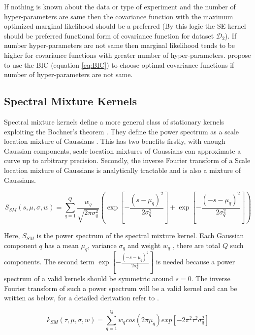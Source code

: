 If nothing is known about the data or type of experiment and the number of hyper-parameters are same then the covariance function with the maximum optimized marginal likelihood should be a preferred (By this logic the SE kernel should be preferred functional form of covariance function for dataset $\mathcal{D}_{2}$). If number hyper-parameters are not same then marginal likelihood tends to be higher for covariance functions with greater number of hyper-parameters. \cite{duvenaud-thesis-2014, lloyd2014automatic} propose to use the BIC (equation \ref{eq:BIC}) to choose optimal covariance functions if number of hyper-parameters are not same. 

\subsection{Spectral Mixture Kernels}\label{subSecSMKernel}
Spectral mixture kernels define a more general class of stationary kernels exploiting the Bochner's theorem \cite{bochner1959lectures}. They define the power spectrum as a scale location mixture of Gaussians \cite{wilson2013gaussian}. This has two benefits firstly, with enough Gaussian components, scale location mixtures of Gaussians can approximate a curve up to arbitrary precision\cite{kostantinos2000gaussian, bishop2006pattern}. Secondly, the inverse Fourier transform of a Scale location mixture of Gaussians is analytically tractable and is also a mixture of Gaussians.

\begin{equation}\label{eqPowerSpectrumSSM}
    S_{SM}(s, \mu, \sigma, w) = \sum_{q=1}^{Q} \frac{w_{q}}{\sqrt{2\pi\sigma_{q}^2}}
\left ( \exp\left [ {-\frac{{(s-\mu_{q})^2}}{2\sigma_{q}^{2}}} \right ] + \exp\left [ {-\frac{{(-s-\mu_{q})^2}}{2\sigma_{q}^{2}}} \right ] \right  )
\end{equation}

Here, $ S_{SM}$ is the power spectrum of the spectral mixture kernel. Each Gaussian  component $q$ has a mean $\mu_{q}$, variance $\sigma_{q}$ and weight $w_{q}$ , there are total $Q$ such components. The second term $\exp\left [ {-\frac{{(-s-\mu_{q})^2}}{2\sigma_{q}^{2}}} \right ]$ is needed because a power spectrum of a valid kernels should be symmetric around $s=0$. The inverse Fourier transform of such a power spectrum will be a valid kernel and can be written as below, for a detailed derivation refer to \cite{wilson2014thesis}.

\begin{equation}\label{eqCovarianceKSM}
k_{SM}(\tau, \mu, \sigma, w) = \sum_{q=1}^{Q}w_{q}cos(2\pi\mu_{q}) exp[-2\pi^{2}\tau^{2}\sigma_{q}^2]
\end{equation}

